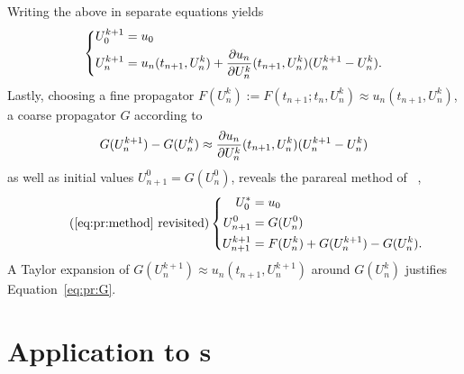 Writing the above in separate equations yields
\begin{equation}
  \left\{
  \begin{aligned}
    U^{k+1}_0 &= u_0 \\
    U^{k+1}_n &= u_n(t_{n+1}, U^k_n) + \pdiff{U^k_n}{u_n}(t_{n+1}, U^k_n) (U^{k+1}_n - U^k_n).
  \end{aligned}
  \right.
\end{equation}
Lastly, choosing a fine propagator $F(U^k_n) := F(t_{n+1}; t_n, U^k_n) \approx u_n(t_{n+1}, U^k_n)$,
a coarse propagator $G$ according to
\begin{equation}
  \label{eq:pr:G}
  G(U^{k+1}_n) - G(U^k_n)
  \approx
  \pdiff{U^k_n}{u_n}(t_{n+1}, U^k_n) (U^{k+1}_n - U^k_n)
\end{equation}
as well as initial values $ U^0_{n+1} = G(U^0_n) $,
reveals the parareal method of \citeauthor{Baffico2002}~\cite{Baffico2002},
\begin{equation}
  \tag{\ref*{eq:pr:method} revisited}
  \left\{
  \begin{aligned}
    U_0^* &= u_0 \\
    U^0_{n+1} &= G(U^0_n) \\
    U^{k+1}_{n+1} &= F(U^k_n) + G(U^{k+1}_n) - G(U^k_n)
    .
  \end{aligned}
  \right.
\end{equation}
A Taylor expansion of $G(U^{k+1}_n) \approx u_n(t_{n+1}, U^{k+1}_n)$ around $G(U^k_n)$ justifies Equation~\eqref{eq:pr:G}.

\section{Application to \texorpdfstring{s}{LRSIFs}}
\label{sec:pr:DRE}

